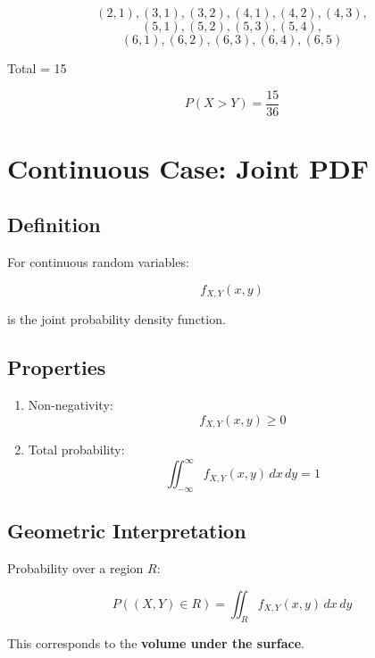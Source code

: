 \documentclass[11pt]{article}
\begin{document}
\[
(2,1), (3,1), (3,2), (4,1), (4,2), (4,3),
\]
\[
(5,1), (5,2), (5,3), (5,4),
\]
\[
(6,1), (6,2), (6,3), (6,4), (6,5)
\]

Total = 15

\[
P(X > Y) = \frac{15}{36}
\]

\vspace{0.5cm}


\section{Continuous Case: Joint PDF}

\subsection{Definition}

For continuous random variables:

\[
f_{X,Y}(x,y)
\]

is the joint probability density function.

\vspace{0.3cm}

\subsection{Properties}

\begin{enumerate}
    \item Non-negativity:
    \[
    f_{X,Y}(x,y) \ge 0
    \]
    
    \item Total probability:
    \[
    \iint_{-\infty}^{\infty} f_{X,Y}(x,y)\,dx\,dy = 1
    \]
\end{enumerate}

\vspace{0.3cm}

\subsection{Geometric Interpretation}

Probability over a region $R$:

\[
P((X,Y)\in R) = \iint_R f_{X,Y}(x,y)\,dx\,dy
\]

This corresponds to the \textbf{volume under the surface}.

\vspace{0.5cm}
\end{document}
